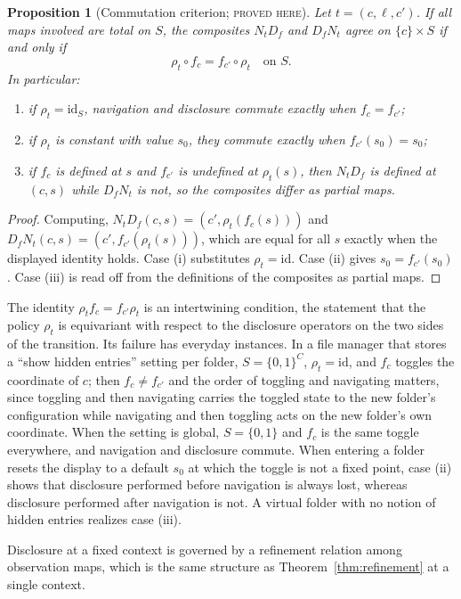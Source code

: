 \documentclass[11pt]{article}
\newtheorem{proposition}[theorem]{Proposition}
\theoremstyle{definition}
\theoremstyle{remark}
\newcommand{\stN}{\textsc{proved here}}
\newcommand{\id}{\mathrm{id}}
\begin{document}
\begin{proposition}[Commutation criterion; \stN]\label{prop:commute}
Let $t=(c,\ell,c')$. If all maps involved are total on $S$, the composites $N_tD_f$ and $D_fN_t$ agree on $\{c\}\times S$ if and only if
\[
\rho_t\circ f_c=f_{c'}\circ\rho_t\quad\text{on }S.
\]
In particular:
\begin{enumerate}[label=(\roman*)]
\item if $\rho_t=\id_S$, navigation and disclosure commute exactly when $f_c=f_{c'}$;
\item if $\rho_t$ is constant with value $s_0$, they commute exactly when $f_{c'}(s_0)=s_0$;
\item if $f_c$ is defined at $s$ and $f_{c'}$ is undefined at $\rho_t(s)$, then $N_tD_f$ is defined at $(c,s)$ while $D_fN_t$ is not, so the composites differ as partial maps.
\end{enumerate}
\end{proposition}
\begin{proof}
Computing, $N_tD_f(c,s)=(c',\rho_t(f_c(s)))$ and $D_fN_t(c,s)=(c',f_{c'}(\rho_t(s)))$, which are equal for all $s$ exactly when the displayed identity holds. Case (i) substitutes $\rho_t=\id$. Case (ii) gives $s_0=f_{c'}(s_0)$. Case (iii) is read off from the definitions of the composites as partial maps.
\end{proof}

The identity $\rho_t f_c=f_{c'}\rho_t$ is an intertwining condition, the statement that the policy $\rho_t$ is equivariant with respect to the disclosure operators on the two sides of the transition. Its failure has everyday instances. In a file manager that stores a ``show hidden entries'' setting per folder, $S=\{0,1\}^C$, $\rho_t=\id$, and $f_c$ toggles the coordinate of $c$; then $f_c\neq f_{c'}$ and the order of toggling and navigating matters, since toggling and then navigating carries the toggled state to the new folder's configuration while navigating and then toggling acts on the new folder's own coordinate. When the setting is global, $S=\{0,1\}$ and $f_c$ is the same toggle everywhere, and navigation and disclosure commute. When entering a folder resets the display to a default $s_0$ at which the toggle is not a fixed point, case (ii) shows that disclosure performed before navigation is always lost, whereas disclosure performed after navigation is not. A virtual folder with no notion of hidden entries realizes case (iii).

Disclosure at a fixed context is governed by a refinement relation among observation maps, which is the same structure as Theorem~\ref{thm:refinement} at a single context.
\end{document}
